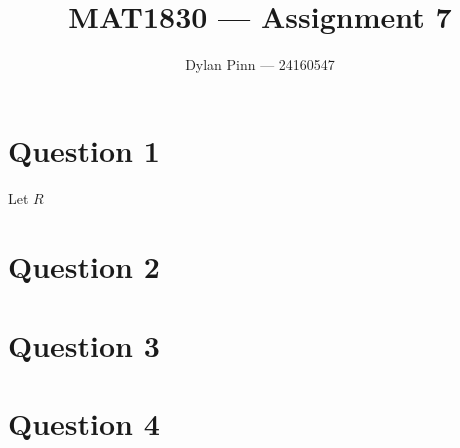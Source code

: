 \documentclass[11pt]{article}
\begin{document}
\title{MAT1830 --- Assignment 7}
\author{Dylan Pinn --- 24160547}
\maketitle

\section*{Question 1}

Let $R$

\section*{Question 2}

\section*{Question 3}

\section*{Question 4}
\end{document}
